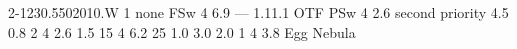 \documentclass[11pt,a4]{article}
\begin{document}
 {2-1}{230.5}{50}{20}{10.}{W}
%
%
\HERAmap
 {1}    %
 {}     %
 {}     %
 {none} %
 {FSw}  %
 {4}    %
 {6.9}  %
 {---}  %
 {1.1}{1.1} {OTF}     {PSw}  {4}    {2.6}  {second priority}
%
%
%
%
\BOLOcompact
 {4.5}  %
 {0.8}  %
 {2}    %
 {4}    %
 {2.6}  %
 {1.5} {15} {4} {6.2}
%
\BOLOmap
 {25}         %
 {1.0}        %
 {3.0}        %
 {2.0}        %
 {1}          %
 {4}          %
 {3.8}        %
 {Egg Nebula} %
%
%
%
%
\end{document}
